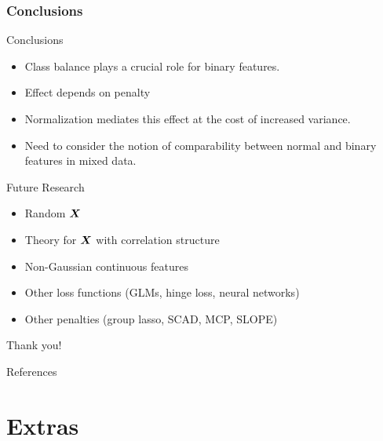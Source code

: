 \documentclass[10pt]{beamer}
\begin{document}
\begin{frame}[c]
  \frametitle{Conclusions}
  \begin{exampleblock}{Conclusions}
    \begin{itemize}
      \item Class balance plays a crucial role for binary features.
      \item Effect depends on penalty
      \item Normalization mediates this effect at the cost of increased variance.
      \item Need to consider the notion of comparability between normal and binary features in mixed
            data.
    \end{itemize}
  \end{exampleblock}

  \pause

  \begin{alertblock}{Future Research}
    \begin{itemize}
      \item Random \(\boldsymbol{X}\)
      \item Theory for \(\boldsymbol{X}\) with correlation structure
      \item Non-Gaussian continuous features
      \item Other loss functions (GLMs, hinge loss, neural networks)
      \item Other penalties (group lasso, SCAD, MCP, SLOPE)
    \end{itemize}
  \end{alertblock}
\end{frame}

\begin{frame}[standout]
  Thank you!
\end{frame}

\appendix

\begin{frame}[allowframebreaks]{References}
  \printbibliography[heading=none]
\end{frame}

\section{Extras}
\end{document}
